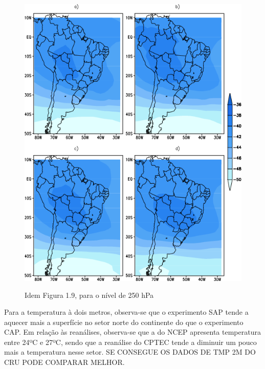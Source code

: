 \begin{figure}[!hbp]
\centering
\includegraphics[height=15cm]{./figs/media_temp_anl_250hPa.png}
\caption{Idem Figura 1.9, para o nível de 250 hPa}
\label{fig41}
\end{figure}

Para a temperatura à dois metros, observa-se que o experimento SAP tende a aquecer mais a superfície no setor norte do continente do que o experimento CAP. Em relação às reanálises, observa-se que a do NCEP apresenta temperatura entre 24ºC e 27ºC, sendo que a reanálise do CPTEC tende a diminuir um pouco mais a temperatura nesse setor.  SE CONSEGUE OS DADOS DE TMP 2M DO CRU PODE COMPARAR MELHOR.

